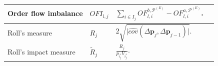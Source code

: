 \documentclass[10pt,a4paper,oneside]{article}
\begin{document}
\begin{longtable}{|p{4cm}|p{2.25cm}|p{5.25cm}|p{2.25cm}|}
    Order flow imbalance                                                                                                                                                   &
    $OFI_{l, j}$                                                                                                                                                           &
    $\sum_{i \in I_j} OF^{b, \mathcal{P}^{(E)}}_{l,i} - OF^{a, \mathcal{P}^{(E)}}_{l,i}$.                                                                                  &
    \cite{cont2013price, kolm2023deep}                                                                                                                                                                                                                                                                                                                                                         \\ \hline

    Roll's measure                                                                                                                                                         &
    $R_j$                                                                                                                                                                  &
    $2 \sqrt{\Big| \hat{cov}(\Delta \mathbf{p}_j, \Delta \mathbf{p}_{j - 1}) \Big|}$.                                                                                      &
    \cite{roll1984simple, easley2021microstructure}                                                                                                                                                                                                                                                                                                                                            \\ \hline

    Roll's impact measure                                                                                                                                                  &
    $\tilde{R}_j$                                                                                                                                                          &
    $\frac{R_j}{p_{i^*_j} V_{i^*_j}}$.                                                                                                                                     &
    \cite{roll1984simple, easley2021microstructure}                                                                                                                                                                                                                                                                                                                                            \\ \hline


\end{longtable}
\end{document}
